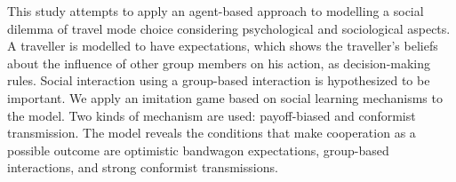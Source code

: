This study attempts to apply an agent-based approach to modelling a social dilemma of travel mode choice considering psychological and sociological aspects. A traveller is modelled to have expectations, which shows the traveller’s beliefs about the influence of other group members on his action, as decision-making rules. Social interaction using a group-based interaction is hypothesized to be important. We apply an imitation game based on social learning mechanisms to the model. Two kinds of mechanism are used: payoff-biased and conformist transmission. The model reveals the conditions that make cooperation as a possible outcome are optimistic bandwagon expectations, group-based interactions, and strong conformist transmissions.
